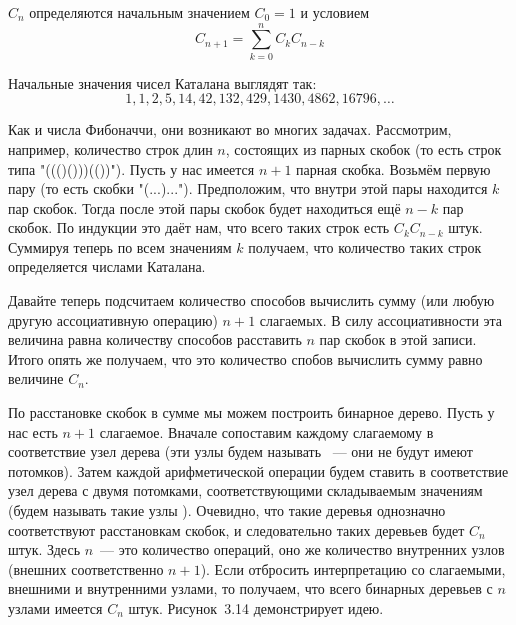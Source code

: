 \begin{definition}
 $C_n$ определяются начальным значением $C_0 = 1$ и условием
$$C_{n+1} = \sum_{k=0}^n C_kC_{n-k}$$
\end{definition}

Начальные значения чисел Каталана выглядят так:
$$1, 1, 2, 5, 14, 42, 132, 429, 1430, 4862, 16796, \ldots$$

Как и числа Фибоначчи, они возникают во многих задачах. Рассмотрим, например, количество строк длин $n$, состоящих из парных скобок (то есть строк типа "((()()))(())"). Пусть у нас имеется $n+1$ парная скобка. Возьмём первую пару (то есть скобки "(...)..."). Предположим, что внутри этой пары находится $k$ пар скобок. Тогда после этой пары скобок будет находиться ещё $n-k$ пар скобок. По индукции это даёт нам, что всего таких строк есть $C_kC_{n-k}$ штук. Суммируя теперь по всем значениям $k$ получаем, что количество таких строк определяется числами Каталана.

Давайте теперь подсчитаем количество способов вычислить сумму (или любую другую ассоциативную операцию) $n+1$ слагаемых. В силу ассоциативности эта величина равна количеству способов расставить $n$ пар скобок в этой записи. Итого опять же получаем, что это количество спобов вычислить сумму равно величине $C_n$.

По расстановке скобок в сумме мы можем построить бинарное дерево. Пусть у нас есть $n+1$ слагаемое. Вначале сопоставим каждому слагаемому в соответствие узел дерева (эти узлы будем называть ~--- они не будут имеют потомков). Затем каждой арифметической операции будем ставить в соответствие узел дерева с двумя потомками, соответствующими складываемым значениям (будем называть такие узлы ). Очевидно, что такие деревья однозначно соответствуют расстановкам скобок, и следовательно таких деревьев будет $C_n$ штук. Здесь $n$~--- это количество операций, оно же количество внутренних узлов (внешних соответственно $n+1$). Если отбросить интерпретацию со слагаемыми, внешними и внутренними узлами, то получаем, что всего бинарных деревьев с $n$ узлами имеется $C_n$ штук. Рисунок~3.14 демонстрирует идею.

